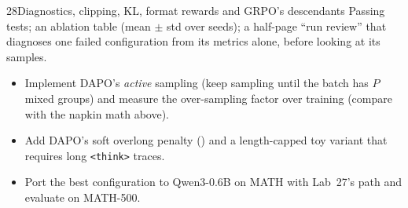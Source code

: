 \begin{labbox}{28}{Diagnostics, clipping, KL, format rewards and GRPO's descendants}
Passing tests; an ablation table (mean $\pm$ std over seeds); a half-page ``run review'' that
diagnoses one failed configuration from its metrics alone, before looking at its samples.

\begin{itemize}
\item Implement DAPO's \emph{active} sampling (keep sampling until the batch has $P$ mixed groups)
and measure the over-sampling factor over training (compare with the napkin math above).
\item Add DAPO's soft overlong penalty () and a
length-capped toy variant that requires long \verb|<think>| traces.
\item Port the best configuration to Qwen3-0.6B on MATH with Lab~27's 
path and evaluate on MATH-500.
\end{itemize}
\end{labbox}
